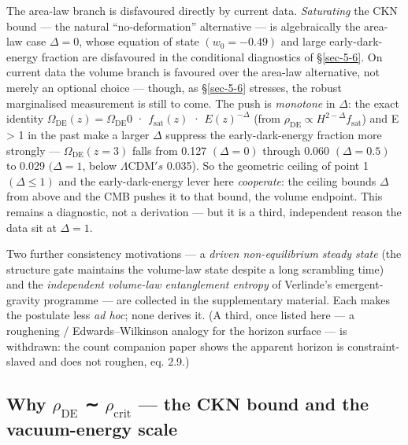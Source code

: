 \documentclass[preprint,12pt]{elsarticle}
\begin{document}
\begin{enumerate}
  The area-law branch is disfavoured directly by current data.
  \emph{Saturating} the CKN bound --- the natural ``no-deformation''
  alternative --- is algebraically the area-law case \(\Delta  = 0\),
  whose equation of state \((w_{0} = -0.49)\) and large
  early-dark-energy fraction are disfavoured in the conditional
  diagnostics of §\ref{sec-5-6}. On current data the volume branch is
  favoured over the area-law alternative, not merely an optional choice
  --- though, as §\ref{sec-5-6} stresses, the robust marginalised
  measurement is still to come. The push is \emph{monotone} in
  \(\Delta\): the exact identity
  \(\Omega _\mathrm{DE}(z) = \Omega _\mathrm{DE}0\) ·
  \(f_{\mathrm{sat}}(z)\) · \(E(z)^{-\Delta }\) (from
  \(\rho _\mathrm{DE} \propto  H^{2-\Delta }f_{\mathrm{sat}}\)) and E
  \textgreater{} 1 in the past make a larger \(\Delta\) suppress the
  early-dark-energy fraction more strongly ---
  \(\Omega _\mathrm{DE}(z = 3)\) falls from 0.127 \((\Delta  = 0)\)
  through 0.060 \((\Delta  = 0.5)\) to 0.029 \((\Delta  = 1\), below
  \(\Lambda \mathrm{CDM}'s\) 0.035). So the geometric ceiling of point 1
  \((\Delta  \leq  1)\) and the early-dark-energy lever here
  \emph{cooperate}: the ceiling bounds \(\Delta\) from above and the CMB
  pushes it to that bound, the volume endpoint. This remains a
  diagnostic, not a derivation --- but it is a third, independent reason
  the data sit at \(\Delta  = 1\).
\end{enumerate}

Two further consistency motivations --- a \emph{driven non-equilibrium
steady state} (the structure gate maintains the volume-law state despite
a long scrambling time) and the \emph{independent volume-law
entanglement entropy} of Verlinde's emergent-gravity programme --- are
collected in the supplementary material. Each makes the postulate less
\emph{ad hoc}; none derives it. (A third, once listed here --- a
roughening / Edwards--Wilkinson analogy for the horizon surface --- is
withdrawn: the count companion paper \citep{Pandev:2026count} shows the
apparent horizon is constraint-slaved and does not roughen, eq. 2.9.)

\subsection{\texorpdfstring{Why \(\rho _\mathrm{DE}\) ∼
\(\rho _{\mathrm{crit}}\) --- the CKN bound and the vacuum-energy
scale}{Why \textbackslash rho \_\textbackslash mathrm\{DE\} ∼ \textbackslash rho \_\{\textbackslash mathrm\{crit\}\} --- the CKN bound and the vacuum-energy scale}}\label{sec-8-2}
\end{document}
